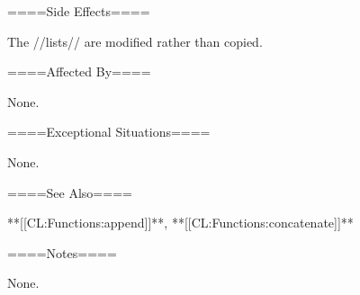 ====Side Effects====

The //lists// are modified rather than copied.

====Affected By====

None.

====Exceptional Situations====

None.

====See Also====

**[[CL:Functions:append]]**, **[[CL:Functions:concatenate]]**

====Notes====

None.

  
